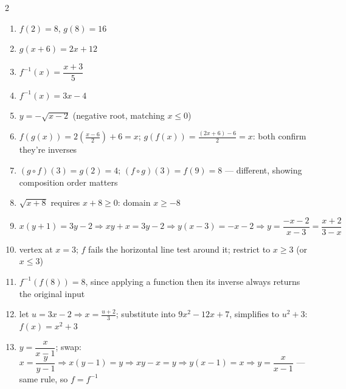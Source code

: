\documentclass[11pt]{article}
\begin{document}
\begin{keybox}
\begin{multicols}{2}
\small
\begin{enumerate}[leftmargin=*,itemsep=3pt]
  \item $f(2)=8$, $g(8)=16$
  \item $g(x+6)=2x+12$
  \item $f^{-1}(x)=\dfrac{x+3}{5}$
  \item $f^{-1}(x)=3x-4$
  \item $y=-\sqrt{x-2}$ (negative root, matching $x\leq0$)
  \item $f(g(x))=2\left(\tfrac{x-6}{2}\right)+6=x$; $g(f(x))=\tfrac{(2x+6)-6}{2}=x$: both confirm they're inverses
  \item $(g\circ f)(3)=g(2)=4$; $(f\circ g)(3)=f(9)=8$ --- different, showing composition order matters
  \item $\sqrt{x+8}$ requires $x+8\geq0$: domain $x\geq-8$
  \item $x(y+1)=3y-2\Rightarrow xy+x=3y-2\Rightarrow y(x-3)=-x-2\Rightarrow y=\dfrac{-x-2}{x-3}=\dfrac{x+2}{3-x}$
  \item vertex at $x=3$; $f$ fails the horizontal line test around it; restrict to $x\geq3$ (or $x\leq3$)
  \item $f^{-1}(f(8))=8$, since applying a function then its inverse always returns the original input
  \item let $u=3x-2\Rightarrow x=\tfrac{u+2}3$; substitute into $9x^2-12x+7$, simplifies to $u^2+3$: $f(x)=x^2+3$
  \item $y=\dfrac{x}{x-1}$; swap: $x=\dfrac{y}{y-1}\Rightarrow x(y-1)=y\Rightarrow xy-x=y\Rightarrow y(x-1)=x\Rightarrow y=\dfrac{x}{x-1}$ --- same rule, so $f=f^{-1}$
\end{enumerate}
\end{multicols}
\end{keybox}
\end{document}
